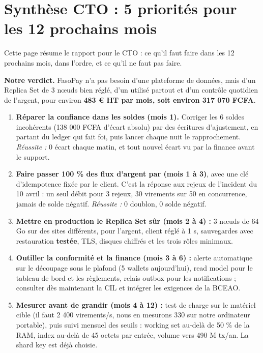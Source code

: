 \documentclass[11pt,a4paper]{article}
\newcommand{\code}[1]{\texttt{\detokenize{#1}}}
\begin{document}
	\section{Synthèse CTO : 5 priorités pour les 12 prochains mois}
	
	Cette page résume le rapport pour le CTO : ce qu'il faut faire dans les 12 prochains mois, dans l'ordre, et ce qu'il ne faut pas faire.
	
	\textbf{Notre verdict.} FasoPay n'a pas besoin d'une plateforme de données, mais d'un Replica Set de 3 nœuds bien réglé, d'un \code{transfer()} utilisé partout et d'un contrôle quotidien de l'argent, pour environ \textbf{483 € HT par mois, soit environ 317 070 FCFA}.
	
	\begin{enumerate}[leftmargin=*]
		\item \textbf{Réparer la confiance dans les soldes (mois 1).} Corriger les 6 soldes incohérents (138 000 FCFA d'écart absolu) par des écritures d'ajustement, en partant du ledger qui fait foi, puis lancer chaque nuit le rapprochement. \emph{Réussite :} 0 écart chaque matin, et tout nouvel écart vu par la finance avant le support.
		\item \textbf{Faire passer 100 \% des flux d'argent par \code{transfer()} (mois 1 à 3)}, avec une clé d'idempotence fixée par le client. C'est la réponse aux rejeux de l'incident du 10 avril : un seul débit pour 3 rejeux, 30 virements sur 50 en concurrence, jamais de solde négatif. \emph{Réussite :} 0 doublon, 0 solde négatif.
		\item \textbf{Mettre en production le Replica Set sûr (mois 2 à 4) :} 3 nœuds de 64 Go sur des sites différents, \code{w: "majority"} pour l'argent, client réglé à 1 s, sauvegardes avec restauration \textbf{testée}, TLS, disques chiffrés et les trois rôles minimaux.
		\item \textbf{Outiller la conformité et la finance (mois 3 à 6) :} alerte automatique sur le découpage sous le plafond (5 wallets aujourd'hui), read model pour le tableau de bord et les règlements, relais outbox pour les notifications ; consulter dès maintenant la CIL et intégrer les exigences de la BCEAO.
		\item \textbf{Mesurer avant de grandir (mois 4 à 12) :} test de charge sur le matériel cible (il faut 2 400 virements/s, nous en mesurons 330 sur notre ordinateur portable), puis suivi mensuel des seuils : working set au-delà de 50 \% de la RAM, index au-delà de 45 octets par entrée, volume vers 490 M tx/an. La shard key est déjà choisie.
	\end{enumerate}
	
\end{document}
